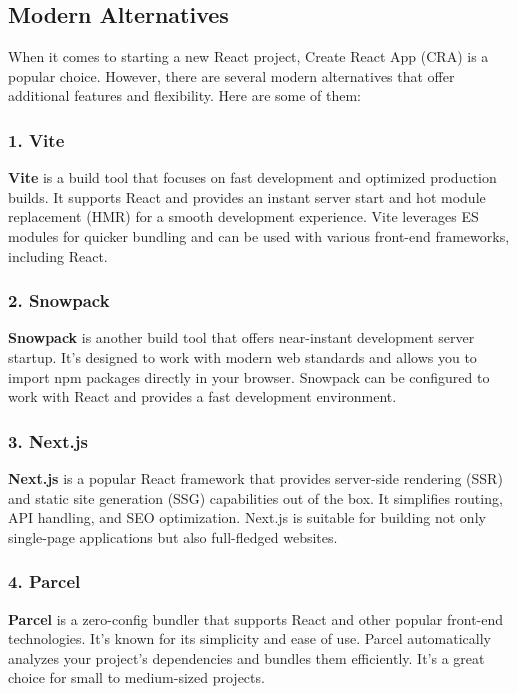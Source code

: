 \documentclass[11pt]{article}
\begin{document}
\subsection{Modern Alternatives}

When it comes to starting a new React project, Create React App (CRA) is a popular choice. However, there are several modern alternatives that offer additional features and flexibility. Here are some of them:

\subsubsection{1. Vite}

\textbf{Vite} is a build tool that focuses on fast development and optimized production builds. It supports React and provides an instant server start and hot module replacement (HMR) for a smooth development experience. Vite leverages ES modules for quicker bundling and can be used with various front-end frameworks, including React.

\subsubsection{2. Snowpack}

\textbf{Snowpack} is another build tool that offers near-instant development server startup. It's designed to work with modern web standards and allows you to import npm packages directly in your browser. Snowpack can be configured to work with React and provides a fast development environment.

\subsubsection{3. Next.js}

\textbf{Next.js} is a popular React framework that provides server-side rendering (SSR) and static site generation (SSG) capabilities out of the box. It simplifies routing, API handling, and SEO optimization. Next.js is suitable for building not only single-page applications but also full-fledged websites.

\subsubsection{4. Parcel}

\textbf{Parcel} is a zero-config bundler that supports React and other popular front-end technologies. It's known for its simplicity and ease of use. Parcel automatically analyzes your project's dependencies and bundles them efficiently. It's a great choice for small to medium-sized projects.
\end{document}
